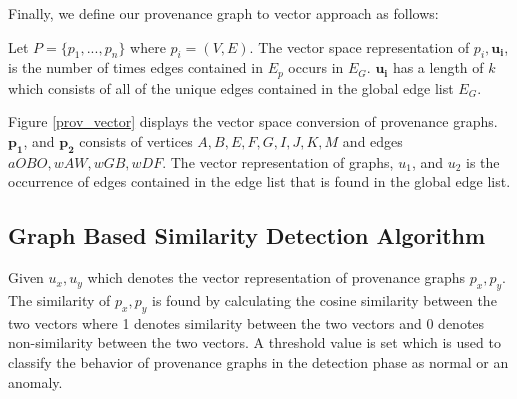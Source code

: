 Finally, we define our provenance graph to vector approach as follows:

\begin{definition}
Let $P = \{p_1,...,p_n\}$ where $p_i = (V, E)$. The vector space representation of $p_i, \boldsymbol{u_i}$, is the number of times edges contained in $E_{p}$ occurs in $E_{G}$. $\boldsymbol{u_i}$ has a length of $k$ which consists of all of the unique edges contained in the global edge list  $E_{G}$. 




 
%
%

\end{definition}



Figure \ref{prov_vector} displays the vector space conversion of provenance graphs. $\boldsymbol{p_1}$, and $\boldsymbol{p_2}$ consists of vertices $A,B,E,F,G, I, J, K, M$ and edges $aOBO, wAW, wGB, wDF$. The vector representation of graphs, $u_1$, and $u_2$ is the occurrence of edges contained in the edge list that is found in the global edge list. 









\subsection{Graph Based Similarity Detection Algorithm}

Given $u_x, u_y$ which denotes the vector representation of provenance graphs $p_x, p_y$. The similarity of $p_x, p_y$ is found by calculating the cosine similarity between the two vectors where 1 denotes similarity between the two vectors and 0 denotes non-similarity between the two vectors. A threshold value is set which is used to classify the behavior of provenance graphs in the detection phase as normal or an anomaly.


